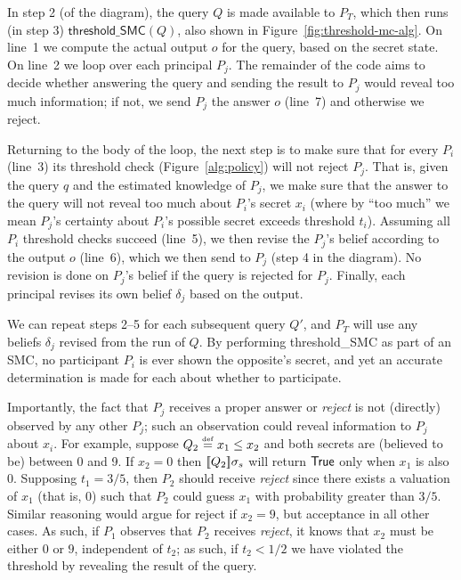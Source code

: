 \documentclass[10pt]{sigplanconf}
\begin{document}
In step 2 (of the diagram), the query $Q$ is made available to $P_T$,
which then runs (in step 3) $\mathsf{threshold\_SMC}(Q)$, also shown
in Figure~\ref{fig:threshold-mc-alg}.  On line~1 we compute the actual
output $o$ for the query, based on the secret state.  On line~2 we
loop over each principal $P_j$.  The remainder of the code aims to
decide whether answering the query and sending the result to $P_j$
would reveal too much information; if not, we send $P_j$ the answer
$o$ (line~7) and otherwise we reject.

Returning to the body of the loop, the
next step is to make sure that for every $P_i$ (line~3) its threshold
check (Figure~\ref{alg:policy}) will not reject $P_j$.  That is, given
the query $q$ and the estimated knowledge of $P_j$, we make sure that
the answer to the query will not reveal too much about $P_i$'s secret
$x_i$ (where by ``too much'' we mean $P_j$'s certainty about $P_i$'s
possible secret exceeds threshold $t_i$).  Assuming all $P_i$
threshold checks succeed (line~5), we then revise the $P_j$'s belief
according to the output $o$ (line~6), which we then send to $P_j$
(step 4 in the diagram).  No
revision is done on $P_j$'s belief if the query is rejected for
$P_j$. Finally, each principal revises its own belief $\delta_j$ based
on the output.

We can repeat steps 2--5 for each subsequent query $Q'$, and $P_T$
will use any beliefs $\delta_j$ revised from the run of $Q$.  By
performing \textsf{threshold\_SMC} as part of an SMC, no participant
$P_i$ is ever shown the opposite's secret, and yet an accurate
determination is made for each about whether to participate.

Importantly, the fact that $P_j$ receives a
proper answer or \emph{reject} is not (directly) observed by any other
$P_j$; such an observation could reveal information to $P_j$ about
$x_i$. For example, suppose $Q_2 \stackrel{\smash{\scriptscriptstyle \mathrm{def}}}= x_1 \leq x_2$ and both secrets
are (believed to be) between 0 and 9.  If $x_2 = 0$ then
$[\![{Q_2}]\!]{\sigma_s}$ will return $\mathsf{True}$ only when $x_1$ is also
$0$.  Supposing $t_1 = 3/5$, then $P_2$ should receive \emph{reject}
since there exists a valuation of $x_1$ (that is, 0) such that $P_2$
could guess $x_1$ with probability greater than $3/5$.  Similar
reasoning would argue for reject if $x_2 = 9$, but acceptance in all
other cases.  As such, if $P_1$ observes that $P_2$ receives
\emph{reject}, it knows that $x_2$ must be either $0$ or $9$,
independent of $t_2$; as such, if $t_2 < 1/2$ we have violated the
threshold by revealing the result of the query.
\end{document}
